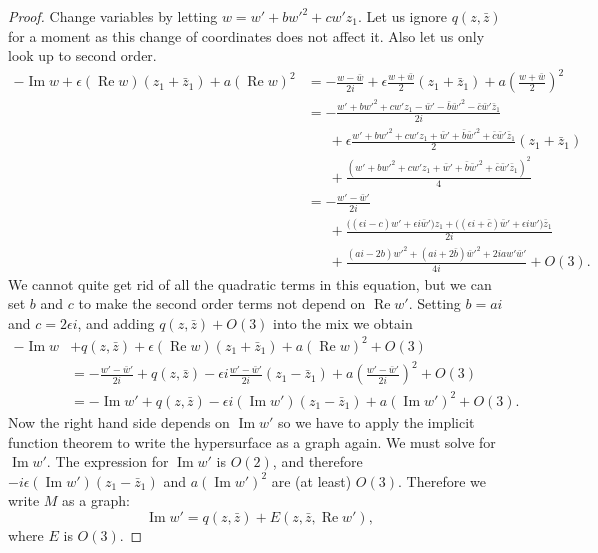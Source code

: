 \documentclass[12pt,openany]{book}
\renewcommand{\Re}{\operatorname{Re}}
\renewcommand{\Im}{\operatorname{Im}}
\theoremstyle{plain}
\theoremstyle{remark}
\theoremstyle{definition}
\theoremstyle{exercise}
\theoremstyle{example}
\begin{document}
\begin{proof}
Change variables
by letting $w = w'+bw'^2+cw'z_1$.  Let us ignore $q(z,\bar{z})$ for a moment as
this change of coordinates does not affect it.  Also let us only look up to
second order.
\begin{equation*}
\begin{split}
-\Im w +
\epsilon (\Re w) (z_1+\bar{z}_1)
+
a {(\Re w)}^2
& =
-\frac{w-\bar{w}}{2i} +
\epsilon \frac{w+\bar{w}}{2}(z_1+\bar{z}_1)
+
a{\left(\frac{w+\bar{w}}{2}\right)}^2
\\
& =
-\frac{w'+bw'^2+cw'z_1-\bar{w}'-\bar{b}\bar{w}'^2-\bar{c}\bar{w}'\bar{z}_1}{2i} 
\\
& \phantom{=}~
+\epsilon \frac{w'+bw'^2+cw'z_1+\bar{w}'+\bar{b}\bar{w}'^2+\bar{c}\bar{w}'\bar{z}_1}{2}(z_1+\bar{z}_1)
\\
& \phantom{=}~
+ \frac{{(w'+bw'^2+cw'z_1+\bar{w}'+\bar{b}\bar{w}'^2+\bar{c}\bar{w}'\bar{z}_1)}^2}{4}
\\
& =
-\frac{w'-\bar{w}'}{2i} 
\\
& \phantom{=}~
+\frac{
\bigl((\epsilon i-c)w'
+\epsilon i\bar{w}'\bigr)z_1
+\bigl((\epsilon i+\bar{c})\bar{w}'
+\epsilon iw'\bigr)\bar{z}_1
}{2i}
\\
& \phantom{=}~
+ \frac{(ai-2b)w'^2+(ai+2\bar{b})\bar{w}'^2+2iaw'\bar{w}'}{4i}
+O(3) .
\end{split}
\end{equation*}
We cannot quite get rid of all the quadratic terms in this equation, but we can set
$b$ and $c$ to make the second order terms not depend on $\Re w'$.
Setting $b=ai$ and $c=2\epsilon i$, and adding $q(z,\bar{z}) + O(3)$ into the mix we obtain
\begin{equation*}
\begin{split}
-\Im w & +
q(z,\bar{z}) +
\epsilon (\Re w) (z_1+\bar{z}_1)
+ a{(\Re w)}^2
+O(3)
\\
& =
-\frac{w'-\bar{w}'}{2i} 
+
q(z,\bar{z}) 
- \epsilon i
\frac{w' -\bar{w}'}{2i}
( z_1 -\bar{z}_1)
+ a {\left(\frac{w'-\bar{w}'}{2i}\right)}^2
+O(3)
\\
& =
-\Im w'
+ q(z,\bar{z})
-
\epsilon i
(\Im w')
( z_1 -\bar{z}_1)
+
a {(\Im w')}^2
+O(3) .
\end{split}
\end{equation*}
Now the right hand side depends on $\Im w'$ so we have to apply the implicit
function theorem to write the hypersurface as a graph again. We must solve
for $\Im w'$.  The expression for $\Im w'$
is $O(2)$, and therefore $-i\epsilon (\Im w')(z_1-\bar{z}_1)$ 
and $a{(\Im w')}^2$ are (at least) $O(3)$.
Therefore we write $M$ as a graph:
\begin{equation*}
\Im w' = q(z,\bar{z}) + E(z,\bar{z},\Re w'),
\end{equation*}
where $E$ is $O(3)$.


\end{proof}
\end{document}
